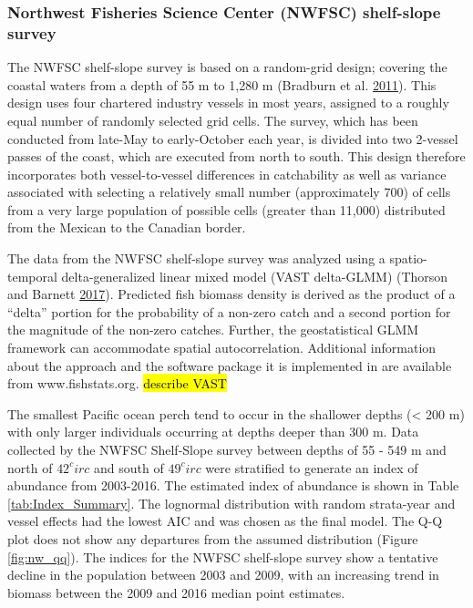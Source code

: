 \documentclass[12pt,]{article}
\begin{document}
\subsubsection{Northwest Fisheries Science Center (NWFSC) shelf-slope
survey}\label{northwest-fisheries-science-center-nwfsc-shelf-slope-survey}

The NWFSC shelf-slope survey is based on a random-grid design; covering
the coastal waters from a depth of 55 m to 1,280 m (Bradburn et al.
\protect\hyperlink{ref-bradburn_2003_2011}{2011}). This design uses four
chartered industry vessels in most years, assigned to a roughly equal
number of randomly selected grid cells. The survey, which has been
conducted from late-May to early-October each year, is divided into two
2-vessel passes of the coast, which are executed from north to south.
This design therefore incorporates both vessel-to-vessel differences in
catchability as well as variance associated with selecting a relatively
small number (approximately 700) of cells from a very large population
of possible cells (greater than 11,000) distributed from the Mexican to
the Canadian border.

The data from the NWFSC shelf-slope survey was analyzed using a
spatio-temporal delta-generalized linear mixed model (VAST delta-GLMM)
(Thorson and Barnett
\protect\hyperlink{ref-thorson_comparing_2017}{2017}). Predicted fish
biomass density is derived as the product of a ``delta'' portion for the
probability of a non-zero catch and a second portion for the magnitude
of the non-zero catches. Further, the geostatistical GLMM framework can
accommodate spatial autocorrelation. Additional information about the
approach and the software package it is implemented in are available
from www.fishstats.org. \hl{describe VAST}

The smallest Pacific ocean perch tend to occur in the shallower depths
(\textless{} 200 m) with only larger individuals occurring at depths
deeper than 300 m. Data collected by the NWFSC Shelf-Slope survey
between depths of 55 - 549 m and north of \(42^circ\) and south of
\(49^circ\) were stratified to generate an index of abundance from
2003-2016. The estimated index of abundance is shown in Table
\ref{tab:Index_Summary}. The lognormal distribution with random
strata-year and vessel effects had the lowest AIC and was chosen as the
final model. The Q-Q plot does not show any departures from the assumed
distribution (Figure \ref{fig:nw_qq}). The indices for the NWFSC
shelf-slope survey show a tentative decline in the population between
2003 and 2009, with an increasing trend in biomass between the 2009 and
2016 median point estimates.
\end{document}
